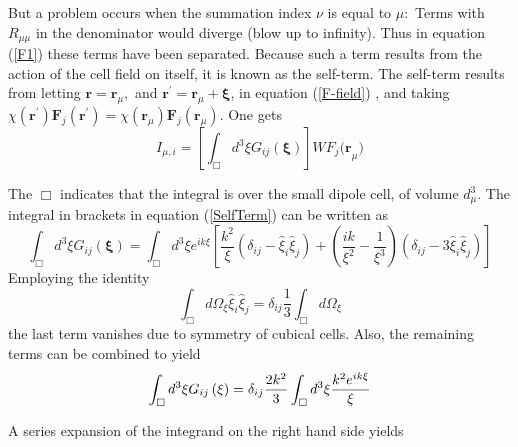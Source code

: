 \documentclass{article}
\begin{document}
But a problem occurs when the summation index $\nu $ is equal to $\mu :$
Terms with $R_{\mu \mu }$ in the denominator would diverge (blow up to
infinity). Thus in equation (\ref{F1}) these terms have been separated.
Because such a term results from the action of the cell field on itself, it
is known as the self-term. The self-term results from letting $\mathbf{r}=%
\mathbf{r}_{\mu },$ and $\mathbf{r}^{\prime }=\mathbf{r}_{\mu }+\mathbf{\xi }
$, in equation (\ref{F-field}) , and taking $\chi \left( \mathbf{r}^{\prime
}\right) \mathbf{F}_{j}\left( \mathbf{r}^{\prime }\right) =\chi \left( 
\mathbf{r}_{\mu }\right) \mathbf{F}_{j}\left( \mathbf{r}_{\mu }\right) .$
One gets 
\begin{equation}
I_{\mu ,i}=\left[ \int_{\Box }d^{3}\xi G_{ij}\left( \mathbf{\xi }\right) %
\right] WF_{j}\mathbf{(r}_{\mu })
\end{equation}

The $\Box $ indicates that the integral is over the small dipole cell, of
volume $d_{\mu }^{3}.$ The integral in brackets in equation (\ref{SelfTerm})
can be written as 
\begin{equation}
\int_{\Box }d^{3}\xi G_{ij}\left( \mathbf{\xi }\right) =\int_{\Box }d^{3}\xi
e^{ik\xi }\left[ \frac{k^{2}}{\xi }\left( \delta _{ij}-\hat{\xi}_{i}\hat{\xi}%
_{j}\right) +\left( \frac{ik}{\xi ^{2}}-\frac{1}{\xi ^{3}}\right) \left(
\delta _{ij}-3\hat{\xi}_{i}\hat{\xi}_{j}\right) \right]
\end{equation}
Employing the identity 
\begin{equation}
\int_{\Box }d\Omega _{\xi }\hat{\xi}_{i}\hat{\xi}_{j}=\delta _{ij}\frac{1}{3}%
\int_{\Box }d\Omega _{\xi }
\end{equation}
the last term vanishes due to symmetry of cubical cells. Also, the remaining
terms can be combined to yield 
\begin{equation}
\int_{\Box }d^{3}\xi G_{ij}\left( \mathbf{\xi }\right) =\delta _{ij}\frac{%
2k^{2}}{3}\int_{\Box }d^{3}\xi \frac{k^{2}e^{ik\xi }}{\xi }
\end{equation}

A series expansion of the integrand on the right hand side yields
\end{document}
